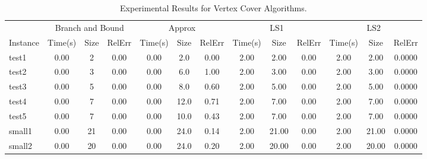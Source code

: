 \documentclass[sigconf]{acmart}
\begin{document}
\begin{table}[t]
  \centering
  \small
  \caption{Experimental Results for Vertex Cover Algorithms.}
  \label{tab:results}
  \begin{tabular}{l|ccc|ccc|ccc|ccc}
    \toprule
             & \multicolumn{3}{c|}{Branch and Bound} & \multicolumn{3}{c|}{Approx} & \multicolumn{3}{c|}{LS1} & \multicolumn{3}{c}{LS2}                                                                             \\
    \cmidrule(lr){2-4} \cmidrule(lr){5-7} \cmidrule(lr){8-10} \cmidrule(lr){11-13}
    Instance & Time(s)                               & Size                        & RelErr                   & Time(s)                 & Size   & RelErr & Time(s) & Size    & RelErr & Time(s) & Size    & RelErr \\
    \midrule
    test1    & 0.00                                  & 2                           & 0.00                     & 0.00                    & 2.0    & 0.00   & 2.00    & 2.00    & 0.00   & 2.00    & 2.00    & 0.0000 \\
    test2    & 0.00                                  & 3                           & 0.00                     & 0.00                    & 6.0    & 1.00   & 2.00    & 3.00    & 0.00   & 2.00    & 3.00    & 0.0000 \\
    test3    & 0.00                                  & 5                           & 0.00                     & 0.00                    & 8.0    & 0.60   & 2.00    & 5.00    & 0.00   & 2.00    & 5.00    & 0.0000 \\
    test4    & 0.00                                  & 7                           & 0.00                     & 0.00                    & 12.0   & 0.71   & 2.00    & 7.00    & 0.00   & 2.00    & 7.00    & 0.0000 \\
    test5    & 0.00                                  & 7                           & 0.00                     & 0.00                    & 10.0   & 0.43   & 2.00    & 7.00    & 0.00   & 2.00    & 7.00    & 0.0000 \\
    small1   & 0.00                                  & 21                          & 0.00                     & 0.00                    & 24.0   & 0.14   & 2.00    & 21.00   & 0.00   & 2.00    & 21.00   & 0.0000 \\
    small2   & 0.00                                  & 20                          & 0.00                     & 0.00                    & 24.0   & 0.20   & 2.00    & 20.00   & 0.00   & 2.00    & 20.00   & 0.0000 \\

\end{tabular}
\end{table}
\end{document}
